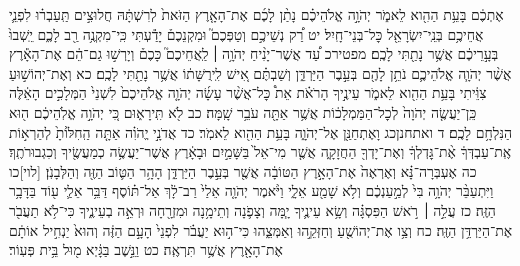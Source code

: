 \documentclass[twoside, openany, parskip=half, 11pt]{book}
\begin{document}
אֶתְכֶ֔ם בָּעֵ֥ת הַהִ֖וא לֵאמֹ֑ר יְהֹוָ֣ה אֱלֹהֵיכֶ֗ם נָתַ֨ן לָכֶ֜ם אֶת־הָאָ֤רֶץ הַזֹּאת֙ לְרִשְׁתָּ֔הּ חֲלוּצִ֣ים תַּֽעַבְר֗וּ לִפְנֵ֛י אֲחֵיכֶ֥ם בְּנֵֽי־יִשְׂרָאֵ֖ל כׇּל־בְּנֵי־חָֽיִל׃ יט רַ֠ק נְשֵׁיכֶ֣ם וְטַפְּכֶם֮ וּמִקְנֵכֶם֒ יָדַ֕עְתִּי כִּֽי־מִקְנֶ֥ה רַ֖ב לָכֶ֑ם יֵֽשְׁבוּ֙ בְּעָ֣רֵיכֶ֔ם אֲשֶׁ֥ר נָתַ֖תִּי לָכֶֽם׃ מפטירכ עַ֠ד אֲשֶׁר־יָנִ֨יחַ יְהֹוָ֥ה ׀ לַֽאֲחֵיכֶם֮ כָּכֶם֒ וְיָרְשׁ֣וּ גַם־הֵ֔ם אֶת־הָאָ֕רֶץ אֲשֶׁ֨ר יְהֹוָ֧ה אֱלֹהֵיכֶ֛ם נֹתֵ֥ן לָהֶ֖ם בְּעֵ֣בֶר הַיַּרְדֵּ֑ן וְשַׁבְתֶּ֗ם אִ֚ישׁ לִֽירֻשָּׁת֔וֹ אֲשֶׁ֥ר נָתַ֖תִּי לָכֶֽם׃ כא וְאֶת־יְהוֹשׁ֣וּעַ צִוֵּ֔יתִי בָּעֵ֥ת הַהִ֖וא לֵאמֹ֑ר עֵינֶ֣יךָ הָרֹאֹ֗ת אֵת֩ כׇּל־אֲשֶׁ֨ר עָשָׂ֜ה יְהֹוָ֤ה אֱלֹהֵיכֶם֙ לִשְׁנֵי֙ הַמְּלָכִ֣ים הָאֵ֔לֶּה כֵּֽן־יַעֲשֶׂ֤ה יְהֹוָה֙ לְכׇל־הַמַּמְלָכ֔וֹת אֲשֶׁ֥ר אַתָּ֖ה עֹבֵ֥ר שָֽׁמָּה׃ כב לֹ֖א תִּֽירָא֑וּם כִּ֚י יְהֹוָ֣ה אֱלֹֽהֵיכֶ֔ם ה֖וּא הַנִּלְחָ֥ם לָכֶֽם׃
ד ואתחנןכג וָאֶתְחַנַּ֖ן אֶל־יְהֹוָ֑ה בָּעֵ֥ת הַהִ֖וא לֵאמֹֽר׃ כד אֲדֹנָ֣י יֱהֹוִ֗ה אַתָּ֤ה הַֽחִלּ֙וֹתָ֙ לְהַרְא֣וֹת אֶֽת־עַבְדְּךָ֔ אֶ֨ת־גׇּדְלְךָ֔ וְאֶת־יָדְךָ֖ הַחֲזָקָ֑ה אֲשֶׁ֤ר מִי־אֵל֙ בַּשָּׁמַ֣יִם וּבָאָ֔רֶץ אֲשֶׁר־יַעֲשֶׂ֥ה כְמַעֲשֶׂ֖יךָ וְכִגְבוּרֹתֶֽךָ׃ כה אֶעְבְּרָה־נָּ֗א וְאֶרְאֶה֙ אֶת־הָאָ֣רֶץ הַטּוֹבָ֔ה אֲשֶׁ֖ר בְּעֵ֣בֶר הַיַּרְדֵּ֑ן הָהָ֥ר הַטּ֛וֹב הַזֶּ֖ה וְהַלְּבָנֹֽן׃ [לוי]כו וַיִּתְעַבֵּ֨ר יְהֹוָ֥ה בִּי֙ לְמַ֣עַנְכֶ֔ם וְלֹ֥א שָׁמַ֖ע אֵלָ֑י וַיֹּ֨אמֶר יְהֹוָ֤ה אֵלַי֙ רַב־לָ֔ךְ אַל־תּ֗וֹסֶף דַּבֵּ֥ר אֵלַ֛י ע֖וֹד בַּדָּבָ֥ר הַזֶּֽה׃ כז עֲלֵ֣ה ׀ רֹ֣אשׁ הַפִּסְגָּ֗ה וְשָׂ֥א עֵינֶ֛יךָ יָ֧מָּה וְצָפֹ֛נָה וְתֵימָ֥נָה וּמִזְרָ֖חָה וּרְאֵ֣ה בְעֵינֶ֑יךָ כִּי־לֹ֥א תַעֲבֹ֖ר אֶת־הַיַּרְדֵּ֥ן הַזֶּֽה׃ כח וְצַ֥ו אֶת־יְהוֹשֻׁ֖עַ וְחַזְּקֵ֣הוּ וְאַמְּצֵ֑הוּ כִּי־ה֣וּא יַעֲבֹ֗ר לִפְנֵי֙ הָעָ֣ם הַזֶּ֔ה וְהוּא֙ יַנְחִ֣יל אוֹתָ֔ם אֶת־הָאָ֖רֶץ אֲשֶׁ֥ר תִּרְאֶֽה׃ כט וַנֵּ֣שֶׁב בַּגָּ֔יְא מ֖וּל בֵּ֥ית פְּעֽוֹר׃
\end{document}
